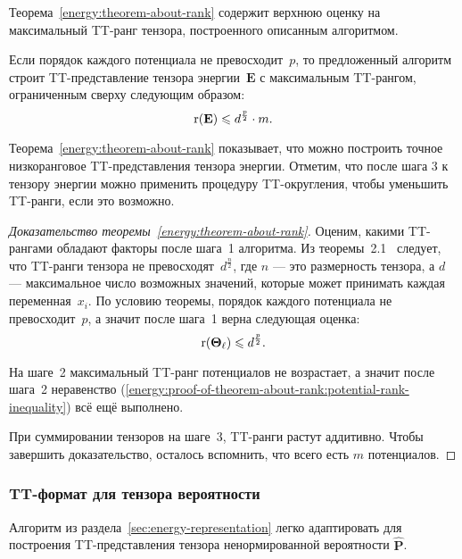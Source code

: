 Теорема~\ref{energy:theorem-about-rank} содержит верхнюю оценку на максимальный TT\hyp{}ранг тензора, построенного описанным алгоритмом.

\begin{theorem}
\label{energy:theorem-about-rank}
Если порядок каждого потенциала не превосходит~$p$, то предложенный алгоритм строит TT\hyp{}представление тензора энергии~$\mathbf{E}$ с максимальным TT\hyp{}рангом, ограниченным сверху следующим образом:
\begin{equation}
\label{energy:theorem-about-rank:inequality}
\operatorname{r}(\mathbf{E}) \leqslant d^{\frac{p}{2}} \cdot m.
\end{equation}
\end{theorem}

Теорема~\ref{energy:theorem-about-rank} показывает, что можно построить точное низкоранговое TT\hyp{}представления тензора энергии. Отметим, что после шага 3 к тензору энергии можно применить процедуру TT\hyp{}округления, чтобы уменьшить TT\hyp{}ранги, если это возможно.

\begin{proof}[Доказательство теоремы~\ref{energy:theorem-about-rank}]
Оценим, какими TT\hyp{}рангами обладают факторы после шага~1 алгоритма.
Из теоремы~2.1~\cite{oseledets2011ttMain} следует, что TT\hyp{}ранги тензора не превосходят~$d^{\frac{n}{2}}$, где $n$ --- это размерность тензора, а $d$ --- максимальное число возможных значений, которые может принимать каждая переменная~$x_i$.
По условию теоремы, порядок каждого потенциала не превосходит~$p$, а значит после шага~1 верна следующая оценка:
\begin{equation}
\label{energy:proof-of-theorem-about-rank:potential-rank-inequality}
\operatorname{r}(\mathbf{\Theta_\ell}) \leqslant d^{\frac{p}{2}}.
\end{equation}

На шаге~2 максимальный TT\hyp{}ранг потенциалов не возрастает, а значит после шага~2 неравенство (\ref{energy:proof-of-theorem-about-rank:potential-rank-inequality}) всё ещё выполнено.

При суммировании тензоров на шаге~3, TT\hyp{}ранги растут аддитивно. Чтобы завершить доказательство, осталось вспомнить, что всего есть $m$ потенциалов.
\end{proof}

\subsubsection{TT\hyp{}формат для тензора вероятности}
\label{sec:prob-representation}
Алгоритм из раздела~\ref{sec:energy-representation} легко адаптировать для построения TT\hyp{}представления тензора ненормированной вероятности $\widehat{\mathbf{P}}$.

